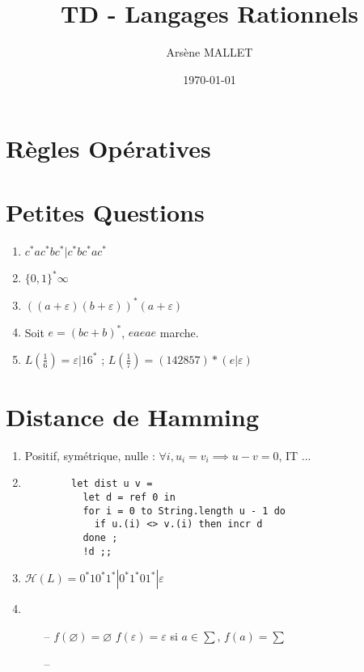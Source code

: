 \documentclass{article}
\title{TD - Langages Rationnels}
\date{\today}
\author{Arsène MALLET}
\begin{document}
\thispagestyle{firstpage}

\begin{center}
    \huge\bfseries{\@title}
\end{center}

\section{R\`egles Op\'eratives}

\section{Petites Questions}

\begin{enumerate}
    \item $c^*ac^*bc^* | c^*bc^*ac^*$
    \item $\{0, 1 \}^* \infty$
    \item $((a + \varepsilon)(b + \varepsilon))^* (a + \varepsilon)$
    \item Soit $e = (bc + b)^*$, $eaeae$ marche.
    \item $L(\frac{1}{6}) = \varepsilon |16^*$ ; $L(\frac{1}{7}) = (142857)*(e|\varepsilon)$
\end{enumerate}

\section{Distance de Hamming}

\begin{enumerate}
    \item Positif, sym\'etrique, nulle : $\forall i, u_i = v_i \implies u - v = 0$, IT ...
    \item \begin{verbatim}
        let dist u v =
          let d = ref 0 in 
          for i = 0 to String.length u - 1 do 
            if u.(i) <> v.(i) then incr d
          done ;
          !d ;;
    \end{verbatim}
    \item $\mathcal{H}(L) = 0^*10^*1^* | 0^*1^*01^* | \varepsilon$ 
    \item \begin{itemize}
        \item[--] $f(\varnothing) = \varnothing$ \newline
            $f(\varepsilon) = \varepsilon$ \newline
            si $a \in \sum$, $f(a) = \sum $
        \item[--]
    \end{itemize}
\end{enumerate}
\end{document}
